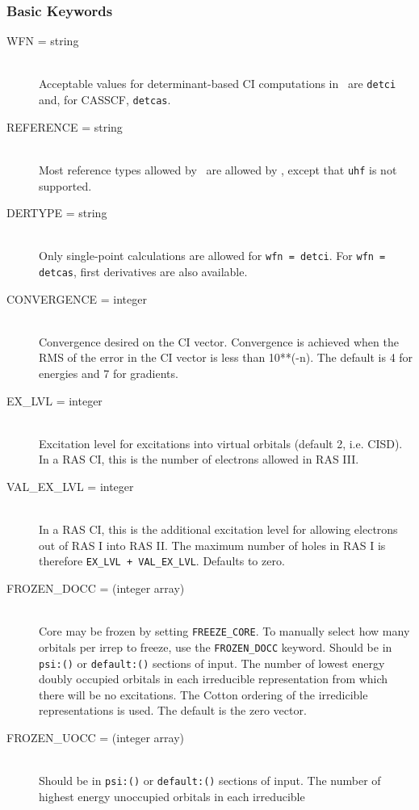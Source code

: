 \subsubsection{Basic Keywords}
\begin{description}
\item[WFN = string]\mbox{}\\
Acceptable values for determinant-based CI computations in \PSIthree\
are {\tt detci} and, for CASSCF, {\tt detcas}.
\item[REFERENCE = string]\mbox{}\\
Most reference types allowed by \PSIthree\ are allowed by \PSIdetci,
except that {\tt uhf} is not supported.
\item[DERTYPE = string]\mbox{}\\
Only single-point calculations are allowed for {\tt wfn = detci}.
For {\tt wfn = detcas}, first derivatives are also available.
\item[CONVERGENCE = integer]\mbox{}\\
Convergence desired on the CI vector.  Convergence is achieved when the
RMS of the error in the CI vector is less than 10**(-n).  The default is 4
for energies and 7 for gradients.
\item[EX\_LVL = integer]\mbox{}\\
Excitation level for excitations into virtual
orbitals (default 2, i.e. CISD).  In a RAS CI, this is the number
of electrons allowed in RAS III.
\item[VAL\_EX\_LVL = integer]\mbox{}\\
In a RAS CI, this is the additional excitation level for allowing
electrons out of RAS I into RAS II.  The maximum number of holes in RAS I
is therefore {\tt EX\_LVL + VAL\_EX\_LVL}.  Defaults to zero.
\item[FROZEN\_DOCC = (integer array)]\mbox{}\\
Core may be frozen by setting {\tt FREEZE\_CORE}.  To
manually select how many orbitals per irrep to freeze, use the
{\tt FROZEN\_DOCC} keyword.
Should be in {\tt psi:()} or {\tt default:()} sections of input.
The number of lowest energy doubly occupied orbitals in each irreducible
representation from which there will be no excitations.
The Cotton ordering of the irredicible representations is used.
The default is the zero vector.
\item[FROZEN\_UOCC = (integer array)]\mbox{}\\
Should be in {\tt psi:()} or {\tt default:()} sections of input.
The number of highest energy unoccupied orbitals in each irreducible

\end{description}
